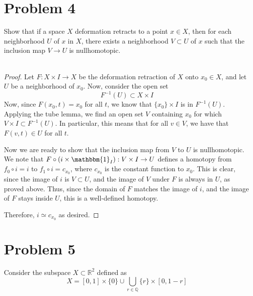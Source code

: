 \documentclass[fontsize=11pt]{scrartcl} %
\numberwithin{equation}{section} %
\numberwithin{figure}{section} %
\numberwithin{table}{section} %
\newcommand{\R}{\mathbb{R}}
\newcommand{\Q}{\mathbb{Q}}
\begin{document}
\section*{Problem 4} %
Show that if a space $X$ deformation retracts to a point $x\in X$, then for each
neighborhood $U$ of $x$ in $X$, there exists a neighborhood $V\subset U$ of $x$
such that the inclusion map $V\to U$ is nullhomotopic.
\\
\\
\begin{proof}
    Let $F:X\times I\to X$ be the deformation retraction of $X$ onto $x_0\in X$,
    and let $U$ be a neighborhood of $x_0$. Now, consider the open set
    \[
        F^{-1}(U)\subset X\times I
    \]
    Now, since $F(x_0,t) = x_0$ for all $t$, we know that $\{x_0\}\times I$ is
    in $F^{-1}(U)$. Applying the tube lemma, we find an open set $V$ containing
    $x_0$ for which $V\times I\subset F^{-1}(U)$. In particular, this means that
    for all $v\in V$, we have that $F(v,t)\in U$ for all $t$.

    Now we are ready to show that the inclusion map from $V$ to $U$ is
    nullhomotopic. We note that $F\circ(i\times \mathbbm{1}_I):V\times I\to U$
    defines a homotopy from $f_0\circ i = i$ to $f_1\circ i = c_{x_0}$, where
    $c_{x_0}$ is the constant function to $x_0$. This is clear, since the image
    of $i$ is $V\subset U$, and the image of $V$ under $F$ is always in $U$, as
    proved above. Thus, since the domain of $F$ matches the image of $i$, and
    the image of $F$ stays inside $U$, this is a well-defined homotopy.

    Therefore, $i\simeq c_{x_0}$ as desired.
\end{proof}

\newpage

\section*{Problem 5} %
Consider the subspace $X\subset \R^2$ defined as
\[
    X = [0,1]\times\{0\} \cup \bigcup_{r\in\Q}\{r\}\times[0,1-r]
\]
\end{document}

